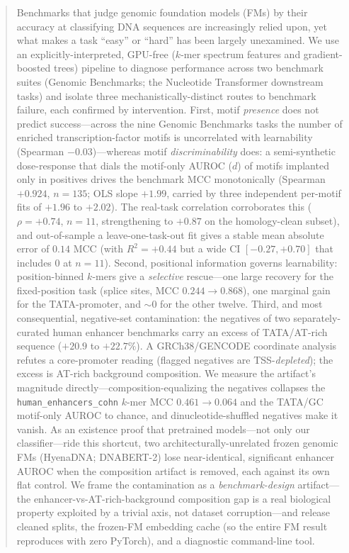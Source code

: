 \documentclass{ws-procs11x85}
\begin{document}
\begin{abstract}
Benchmarks that judge genomic foundation models (FMs) by their accuracy at classifying DNA
sequences are increasingly relied upon, yet what makes a task ``easy'' or ``hard'' has been
largely unexamined. We use an explicitly-interpreted, GPU-free ($k$-mer spectrum features and
gradient-boosted trees) pipeline to diagnose performance across two benchmark suites (Genomic
Benchmarks; the Nucleotide Transformer downstream tasks) and isolate three mechanistically-distinct
routes to benchmark failure, each confirmed by intervention. First, motif \emph{presence} does not
predict success---across the nine Genomic Benchmarks tasks the number of enriched
transcription-factor motifs is uncorrelated with learnability (Spearman $-0.03$)---whereas motif
\emph{discriminability} does: a semi-synthetic dose-response that dials the motif-only AUROC ($d$)
of motifs implanted only in positives drives the benchmark MCC monotonically (Spearman $+0.924$,
$n{=}135$; OLS slope $+1.99$, carried by three independent per-motif fits of $+1.96$ to $+2.02$).
The real-task correlation corroborates this ($\rho{=}+0.74$, $n{=}11$, strengthening to $+0.87$ on
the homology-clean subset), and out-of-sample a leave-one-task-out fit gives a stable mean absolute
error of $0.14$ MCC (with $R^2{=}+0.44$ but a wide CI $[-0.27,+0.70]$ that includes $0$ at $n{=}11$).
Second, positional information governs learnability: position-binned $k$-mers give a \emph{selective}
rescue---one large recovery for the fixed-position task (splice sites, MCC $0.244\to0.868$), one
marginal gain for the TATA-promoter, and $\sim$0 for the other twelve. Third, and most consequential,
negative-set contamination: the negatives of two separately-curated human enhancer benchmarks carry
an excess of TATA/AT-rich sequence ($+20.9$ to $+22.7\%$). A GRCh38/GENCODE coordinate analysis
refutes a core-promoter reading (flagged negatives are TSS-\emph{depleted}); the excess is AT-rich
background composition. We measure the artifact's magnitude directly---composition-equalizing the
negatives collapses the \texttt{human\_enhancers\_cohn} $k$-mer MCC $0.461\to0.064$ and the TATA/GC
motif-only AUROC to chance, and dinucleotide-shuffled negatives make it vanish. As an existence proof
that pretrained models---not only our classifier---ride this shortcut, two architecturally-unrelated
frozen genomic FMs (HyenaDNA; DNABERT-2) lose near-identical, significant enhancer AUROC when the
composition artifact is removed, each against its own flat control. We frame the contamination as a
\emph{benchmark-design} artifact---the enhancer-vs-AT-rich-background composition gap is a real
biological property exploited by a trivial axis, not dataset corruption---and release cleaned splits,
the frozen-FM embedding cache (so the entire FM result reproduces with zero PyTorch), and a diagnostic
command-line tool.
\end{abstract}
\end{document}
